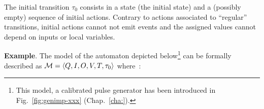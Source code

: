 \medskip The initial transition $\tau_0$ consists in a state (the initial state) and a (possibly
empty) sequence of initial actions. Contrary to actions associated to ``regular'' transitions,
initial actions cannot not emit events and the
assigned values cannot depend on inputs or local variables.
  



\medskip \textbf{Example}. The model of the automaton depicted below\footnote{This model, a
  calibrated pulse generator has been introduced in Fig.~\ref{fig:genimp-xxx} (Chap.~\ref{cha:}).}
can be formally described as $\mathcal{M}=\langle Q, I, O, V, T, \tau_0\rangle$ where~:

